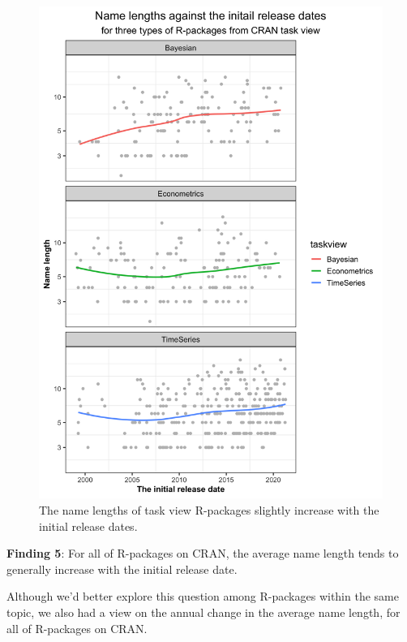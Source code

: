 \documentclass[
]{book}
\newenvironment{discovery}[1]{%
  \begin{tcolorbox}[colback=blue!30,colframe=blue!80!black]#1}{\end{tcolorbox}}
\begin{document}
\begin{figure}

{\centering \includegraphics{figures/namelth-taskview-1} 

}

\caption{The name lengths of task view R-packages slightly increase with the initial release dates.}\label{fig:namelth-taskview}
\end{figure}

\begin{discovery}
\textbf{Finding 5}: For all of R-packages on CRAN, the average name
length tends to generally increase with the initial release date.
\end{discovery}

Although we'd better explore this question among R-packages within the same topic, we also had a view on the annual change in the average name length, for all of R-packages on CRAN.
\end{document}
